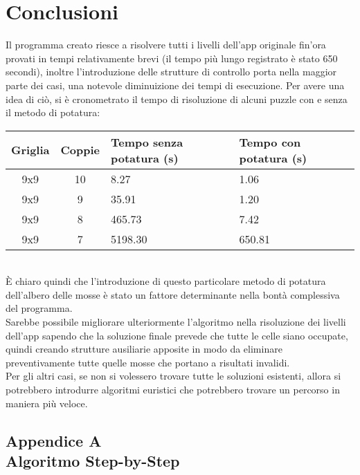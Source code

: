 \documentclass[11pt,a4paper,twocolumn]{IEEEtran}
\newcounter{algoritmo}
\begin{document}
	\section{Conclusioni}
	Il programma creato riesce a risolvere tutti i livelli dell'app originale fin'ora provati in tempi relativamente brevi (il tempo più lungo registrato è stato 650 secondi), inoltre l'introduzione delle strutture di controllo porta nella maggior parte dei casi, una notevole diminuizione dei tempi di esecuzione. Per avere una idea di ciò, si è cronometrato il tempo di risoluzione di alcuni puzzle con e senza il metodo di potatura:\bigskip\\
	\hspace*{-.6cm}
	\begin{tabular}{|c|c|C{2.4cm}|C{2.4cm}|}
		\hline 
		Griglia & Coppie & Tempo senza potatura (s) & Tempo con potatura (s) \\ 
		\hline 
		9x9 & 10 & 8.27 & 1.06 \\ 
		\hline 
		9x9 & 9 & 35.91 & 1.20 \\ 
		\hline 
		9x9 & 8 & 465.73 & 7.42 \\ 
		\hline 
		9x9 & 7 & 5198.30 & 650.81 \\ 
		\hline 
	\end{tabular}\bigskip\\
	\`{E} chiaro quindi che l'introduzione di questo particolare metodo di potatura dell'albero delle mosse è stato un fattore determinante nella bontà complessiva del programma.\\
	Sarebbe possibile migliorare ulteriormente l'algoritmo nella risoluzione dei livelli dell'app sapendo che la soluzione finale prevede che tutte le celle siano occupate, quindi creando strutture ausiliarie apposite in modo da eliminare preventivamente tutte quelle mosse che portano a risultati invalidi.\\
	Per gli altri casi, se non si volessero trovare tutte le soluzioni esistenti, allora si potrebbero introdurre algoritmi euristici che potrebbero trovare un percorso in maniera più veloce.
	\clearpage
	
	\begin{appendices}
		\section*{\textbf{Appendice A}\\Algoritmo Step-by-Step}
		
	\end{appendices}
	
\fi	
\end{document}
